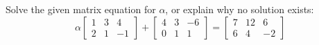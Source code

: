 Solve the given matrix equation for $\alpha$, or explain why no solution exists:
%
\begin{equation*}
\alpha\begin{bmatrix} 1 & 3 & 4 \\ 2 & 1 & -1 \end{bmatrix} +
\begin{bmatrix} 4 & 3 & -6 \\ 0 & 1 & 1 \end{bmatrix}
=
\begin{bmatrix} 7 & 12 & 6 \\ 6 & 4 & -2 \end{bmatrix}
\end{equation*}
%